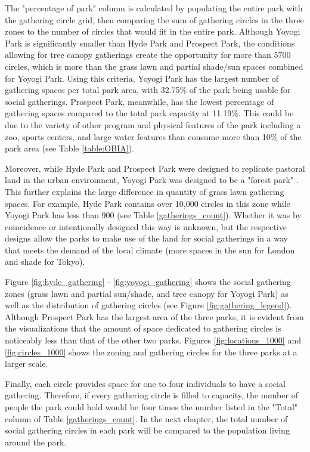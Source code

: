 \begin{multicols}{2}
The "percentage of park" column is calculated by populating the entire park with the gathering circle grid, then comparing the sum of gathering circles in the three zones to the number of circles that would fit in the entire park. Although Yoyogi Park is significantly smaller than Hyde Park and Prospect Park, the conditions allowing for tree canopy gatherings create the opportunity for more than 5700 circles, which is more than the grass lawn and partial shade/sun spaces combined for Yoyogi Park. Using this criteria, Yoyogi Park has the largest number of gathering spaces per total park area, with 32.75\% of the park being usable for social gatherings. Prospect Park, meanwhile, has the lowest percentage of gathering spaces compared to the total park capacity at 11.19\%. This could be due to the variety of other program and physical features of the park including a zoo, sports centers, and large water features than consume more than 10\% of the park area (see Table \ref{table:OBIA}).

Moreover, while Hyde Park and Prospect Park were designed to replicate pastoral land in the urban environment, Yoyogi Park was designed to be a "forest park" \cite{cranz_politics_1989} \cite{fuse__1994}. This further explains the large difference in quantity of grass lawn gathering spaces. For example, Hyde Park contains over 10,000 circles in this zone while Yoyogi Park has less than 900 (see Table \ref{gatherings_count}). Whether it was by coincidence or intentionally designed this way is unknown, but the respective designs allow the parks to make use of the land for social gatherings in a way that meets the demand of the local climate (more spaces in the sun for London and shade for Tokyo). 

Figure \ref{fig:hyde_gathering} - \ref{fig:yoyogi_gathering} shows the social gathering zones (grass lawn and partial sun/shade, and tree canopy for Yoyogi Park) as well as the distribution of gathering circles (see Figure \ref{fig:gathering_legend}). Although Prospect Park has the largest area of the three parks, it is evident from the visualizations that the amount of space dedicated to gathering circles is noticeably less than that of the other two parks. Figures \ref{fig:locations_1000} and \ref{fig:circles_1000} shows the zoning and gathering circles for the three parks at a larger scale. 

Finally, each circle provides space for one to four individuals to have a social gathering. Therefore, if every gathering circle is filled to capacity, the number of people the park could hold would be four times the number listed in the "Total" column of Table \ref{gatherings_count}. In the next chapter, the total number of social gathering circles in each park will be compared to the population living around the park. 


\end{multicols}
